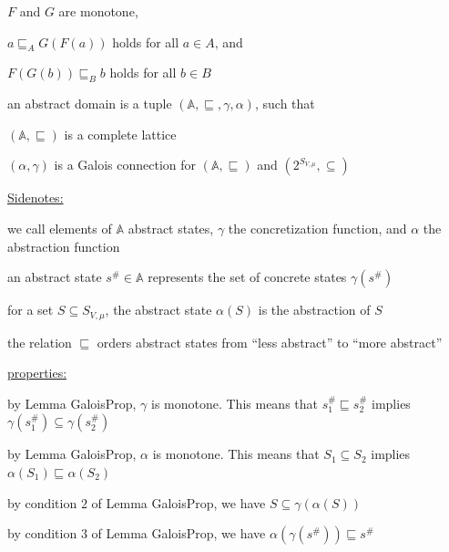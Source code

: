 \documentclass[landscape, a4paper]{article}
\begin{document}
\begin{minipage}[t]{0.2\linewidth}
\begin{betterlist}
		\begin{betterlist}
			\item $F$ and $G$ are \alert{monotone},
			\item $a \sqsubseteq_A G(F(a))$ holds for all $a \in A$, and
			\item $F(G(b)) \sqsubseteq_B b$ holds for all $b \in B$
			\item {}
		\end{betterlist}\color{black}
		\item \color{orange}an \alert{abstract domain} is a tuple $(\mathbb{A}, \sqsubseteq, \gamma, \alpha)$, such that
		\begin{betterlist}
			\item $(\mathbb{A}, \sqsubseteq)$ is a complete lattice
			\item $(\alpha, \gamma)$ is a Galois connection for $(\mathbb{A}, \sqsubseteq)$ and $(2^{S_{V ,\mu}}, \subseteq)$
			\item \underline{Sidenotes:}
			\begin{betterlist}
				\item we call elements of $\mathbb{A}$ \alert{abstract states}, $\gamma$ the \alert{concretization function}, and $\alpha$ the \alert{abstraction function}
				\item an abstract state $s^\# \in \mathbb{A}$ represents the set of concrete states $\gamma(s^\#)$
				\item for a set $S \subseteq S_{V,\mu}$, the abstract state $\alpha(S)$ is the abstraction of $S$
				\item the relation $\sqsubseteq$ orders abstract states from \enquote{less abstract} to \enquote{more abstract}
				\item \underline{properties:}
				\begin{betterlist}
					\item by Lemma GaloisProp, $\gamma$ is monotone. This means that $s^\#_1 \sqsubseteq s^\#_2$ implies $\gamma(s^\#_1) \subseteq \gamma(s^\#_2)$
					\item by Lemma GaloisProp, $\alpha$ is monotone. This means that $S_1 \subseteq S_2$ implies $\alpha(S_1) \sqsubseteq \alpha(S_2)$
					\item by condition $2$ of Lemma GaloisProp, we have $S \subseteq \gamma(\alpha(S))$
					\item by condition $3$ of Lemma GaloisProp, we have $\alpha(\gamma(s^\#)) \sqsubseteq s^\#$
				\end{betterlist}
			\end{betterlist}

\end{betterlist}
\end{betterlist}
\end{minipage}
\end{document}
